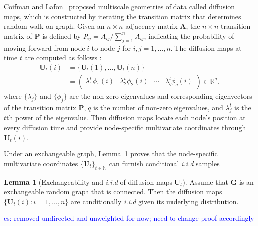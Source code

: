 \documentclass[11pt]{article}
\theoremstyle{definition}
\newtheorem{lemma}[theorem]{Lemma}
\newcommand{\cs}[1]{\textcolor{blue}{cs: #1}}
\begin{document}
Coifman and Lafon~\cite{coifman2006diffusion,lafon2006diffusion} proposed multiscale geometries of data called diffusion maps, which is constructed by iterating the transition matrix that determines random walk on graph. 
Given an $n \times n$ adjacency matrix $\mathbf{A}$, the $n \times n$ transition matrix of $\mathbf{P}$ is defined by $P_{ij} = A_{ij} /  \sum\limits_{j=1}^{n} A_{ij}$, indicating the probability of moving forward from node $i$ to node $j$ for $i,j = 1, \ldots , n$. The diffusion maps at time $t$ are computed as follows :
	\begin{align*}
	\mathbf{U}_{t}(i) &=\{ \mathbf{U}_{t}(1) , \ldots, \mathbf{U}_{t}(n) \}\\
    &= \begin{pmatrix} \lambda^{t}_{1} \phi_{1}(i) & \lambda^{t}_{2} \phi_{2} (i)  & \cdots & \lambda^{t}_{q} \phi_{q}(i) \end{pmatrix} \in \mathbb{R}^{q}.
	\end{align*}
	where $\{ \lambda_{j} \}$ and $\{ \phi_{j}  \}$ are the non-zero eigenvalues and corresponding eigenvectors of the transition matrix $\mathbf{P}$, $q$ is the number of non-zero eigenvalues, and $\lambda^{t}_{j}$ is the $t$th power of the eigenvalue. Then diffusion maps locate each node's position at every diffusion time and provide node-specific multivariate coordinates through $\mathbf{U}_{t}(i)$. 

Under an exchangeable graph, Lemma~\ref{main_lemma} proves that the node-specific multivariate coordinates $\{ \mathbf{U}_{t} \}_{t \in \mathbb{N}}$ can furnish conditional \textit{i.i.d} samples 
\begin{lemma}[Exchangeability and \textit{i.i.d} of diffusion maps $\mathbf{U}_{t}$]
	\label{main_lemma}
	Assume that $\mathbf{G}$ is an exchangeable random graph that is connected. Then the diffusion maps $\{ \mathbf{U}_{t}(i) : i = 1, \ldots, n \}$ are conditionally \textit{i.i.d} given its underlying distribution.   
\end{lemma}
\cs{removed undirected and unweighted for now; need to change proof accordingly} 
\end{document}
